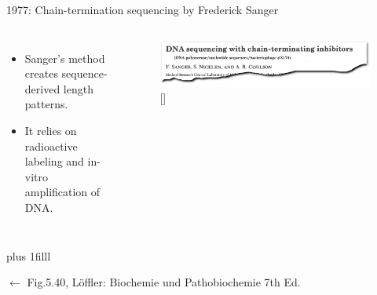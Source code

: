\documentclass[10pt]{beamer}
\newcommand{\credit}[1]{{\vskip0pt plus 1filll \par \raggedleft \scriptsize \mdseries \color{mDarkBrown} #1 \par}}
\newcommand{\citeme}[1]{{\xspace\color{scAqua} \scriptsize [\cite{#1}]}}
\begin{document}
\begin{frame}{1977: Chain-termination sequencing by Frederick Sanger}
\begin{columns}[T,onlytextwidth]
\begin{itemize}
			\item Sanger's method creates sequence-derived length patterns.
			\item It relies on radioactive labeling and in-vitro amplification of DNA.
		\end{itemize}
		\begin{figure}
			\includegraphics[width=\textwidth]{./figures/sangerpaper.png}
			\caption{\citeme{Sanger1977}}
		\end{figure}
	\end{columns}
	\credit{$\leftarrow$ Fig.5.40, Löffler: Biochemie und Pathobiochemie 7th Ed.}
\end{frame}
\end{document}

